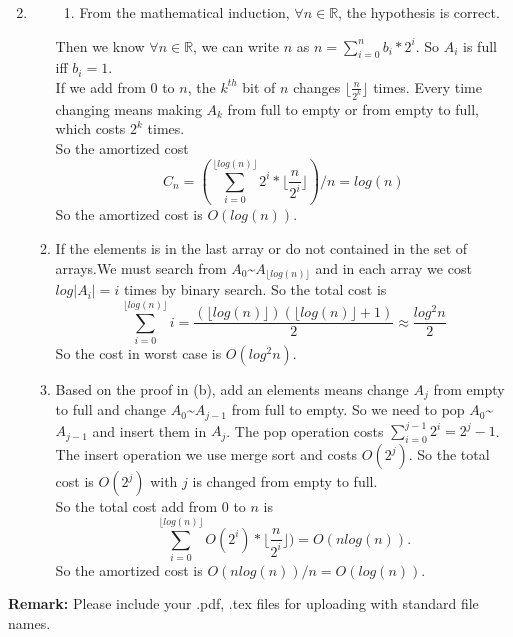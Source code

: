 \documentclass[12pt,a4paper]{article}
\makeatletter
\newtheorem*{solution}{Solution}
\theoremstyle{definition}
\renewenvironment{solution}[1][Solution] {\par\pushQED{\qed}\normalfont\topsep6\p@\@plus6\p@\relax\trivlist\item[\hskip\labelsep\bfseries#1\@addpunct{.}]\ignorespaces}{\popQED\endtrivlist\@endpefalse} \makeatother
\makeatother
\begin{document}
\begin{enumerate}
\begin{solution}
\begin{enumerate}
\begin{enumerate}
	        \item From the mathematical induction, $\forall n\in \mathbb{R}$, the hypothesis is correct.
	    \end{enumerate}
	    Then we know $\forall n\in \mathbb{R}$, we can write $n$ as $n=\sum_{i=0}^{n} b_i*2^i$. So $A_i$ is full iff $b_i=1$.\\
	    If we add from 0 to $n$, the $k^{th}$ bit of $n$ changes $\lfloor \frac{n}{2^k}\rfloor$ times. Every time changing means making $A_k$ from full to empty or from empty to full, which costs $2^k$ times.\\
	    So the amortized cost 
	    \begin{equation}
	        C_n=(\sum_{i=0}^{\lfloor log(n)\rfloor}2^i*\lfloor \frac{n}{2^i}\rfloor)/n=log(n)
	    \end{equation}
	    So the amortized cost is $O(log(n))$.
	    \item If the elements is in the last array or do not contained in the set of arrays.We must search from $A_0$\textasciitilde$A_{\lfloor log(n)\rfloor}$ and in each array we cost $log|A_i|=i$ times by binary search. So the total cost is 
	    \begin{equation}
	        \sum_{i=0}^{\lfloor log(n)\rfloor}i=\frac{(\lfloor log(n)\rfloor)(\lfloor log(n)\rfloor+1)}{2}\approx \frac{log^2n}{2}
	    \end{equation}
	    So the cost in worst case is $O(log^2n)$.
        \item Based on the proof in (b), add an elements means change $A_j$ from empty to full and change $A_0$\textasciitilde$A_{j-1}$ from full to empty. So we need to pop $A_0$\textasciitilde$A_{j-1}$ and insert them in $A_j$. The pop operation costs $\sum_{i=0}^{j-1}2^i=2^j-1$. The insert operation we use merge sort and costs $O(2^j)$. So the total cost is $O(2^j)$ with $j$ is changed from empty to full.\\
        So the total cost add from $0$ to $n$ is 
        \begin{equation}
            \sum_{i=0}^{\lfloor log(n)\rfloor}O(2^i)*\lfloor \frac{n}{2^i}\rfloor)=O(nlog(n)).
        \end{equation}
        So the amortized cost is $O(nlog(n))/n=O(log(n))$.
	\end{enumerate}
	\end{solution}
\end{enumerate}



\textbf{Remark:} Please include your .pdf, .tex files for uploading with standard file names.


\end{document}

